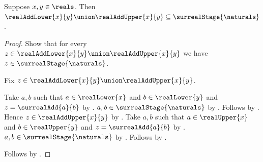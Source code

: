 \begin{proposition}\label{surreal_real_add_bounds_finite_stage}
    Suppose $x,y\in\reals$.
    Then $\realAddLower{x}{y}\union\realAddUpper{x}{y}
        \subseteq\surrealStage{\naturals}$.
\end{proposition}
\begin{proof}
    Show that for every
        $z\in\realAddLower{x}{y}\union\realAddUpper{x}{y}$ we have
        $z\in\surrealStage{\naturals}$.
    \begin{subproof}
        Fix $z\in\realAddLower{x}{y}\union\realAddUpper{x}{y}$.
        \begin{byCase}
                Take $a,b$ such that
                    $a\in\realLower{x}$ and
                    $b\in\realLower{y}$ and
                    $z=\surrealAdd{a}{b}$
                    by .
                $a,b\in\surrealStage{\naturals}$
                    by .
                Follows by .
                Hence $z\in\realAddUpper{x}{y}$
                    by .
                Take $a,b$ such that
                    $a\in\realUpper{x}$ and
                    $b\in\realUpper{y}$ and
                    $z=\surrealAdd{a}{b}$
                    by .
                $a,b\in\surrealStage{\naturals}$
                    by .
                Follows by .
        \end{byCase}
    \end{subproof}
    Follows by .
\end{proof}

